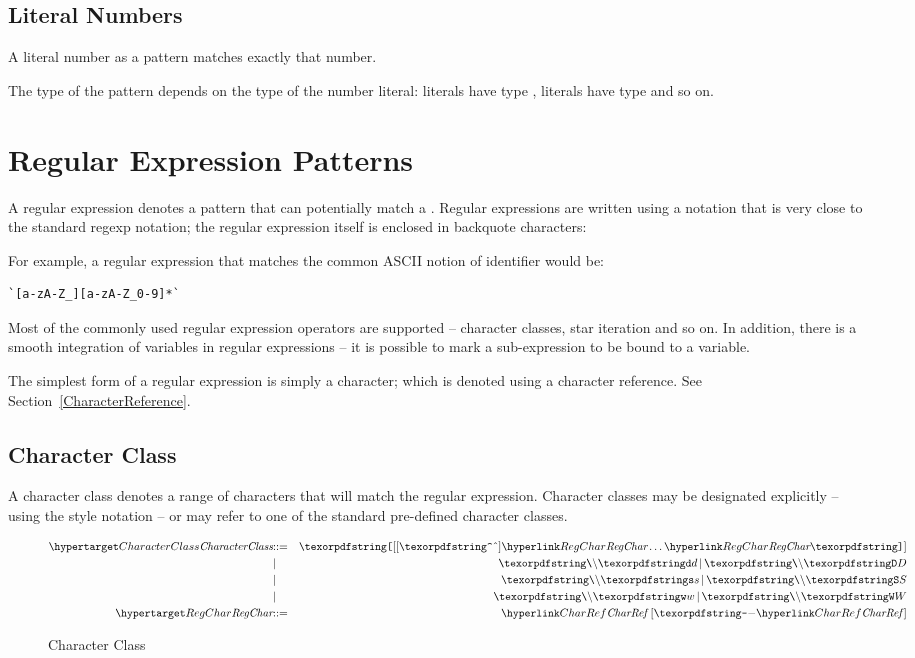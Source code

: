 \subsection{Literal Numbers}
\label{literalNumberPattern}

A literal number as a pattern matches exactly that number.

The type of the pattern depends on the type of the number literal:  literals have type ,  literals have type  and so on.


\section{Regular Expression Patterns}
\label{regularExpressions}
A regular expression denotes a pattern that can potentially match a . Regular expressions are written using a notation that is very close to the standard regexp notation; the regular expression itself is enclosed in backquote characters: 

For example, a regular expression that matches the common ASCII notion of identifier would be:
\begin{lstlisting}
`[a-zA-Z_][a-zA-Z_0-9]*`
\end{lstlisting}

Most of the commonly used regular expression operators are supported -- character classes, star iteration and so on. In addition, there is a smooth integration of variables in regular expressions -- it is possible to mark a sub-expression to be bound to a variable.

The simplest form of a regular expression is simply a character; which is denoted using a character reference. See Section~\vref{CharacterReference}.

\subsection{Character Class}
\label{characterClass}
A character class denotes a range of characters that will match the regular expression. Character classes may be designated explicitly -- using the \q{[a-z]} style notation -- or may refer to one of the standard pre-defined character classes.

\begin{figure}[htbp]
\begin{eqnarray*}
\ntDef{CharacterClass}&\arrow&\q{[}[\q{\uphat}]\ntRef{RegChar}\ldots\ntRef{RegChar}\q{]}\\
&\choice&\q{\bsl}\q{d}\,\choice\,\q{\bsl}\q{D}\\
&\choice&\q{\bsl}\q{s}\,\choice\,\q{\bsl}\q{S}\\
&\choice&\q{\bsl}\q{w}\,\choice\,\q{\bsl}\q{W}\\
\ntDef{RegChar}&\arrow&\ntRef{CharRef}\ [\q{-}\ntRef{CharRef}\,]
\end{eqnarray*}
\caption{Character Class}
\label{charClassFig}
\end{figure}

